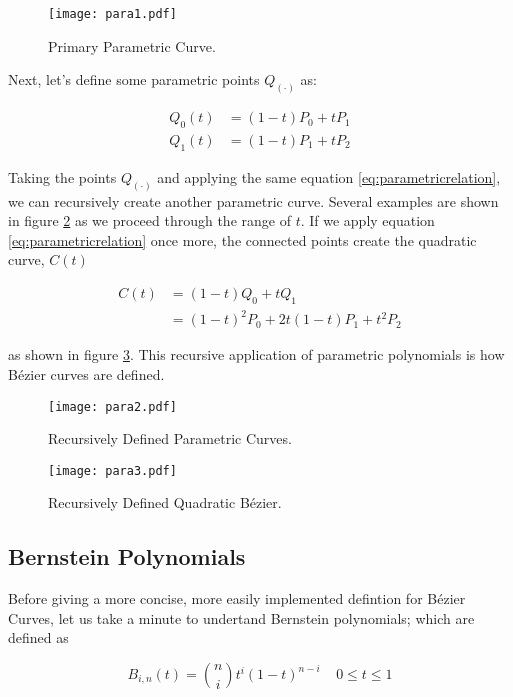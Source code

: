 \begin{figure}[htbp]
	\centering
	\texttt{[image: para1.pdf]}
	\caption{Primary Parametric Curve.}
	\label{fig:para1}
\end{figure}

Next, let's define some parametric points $Q_{(\cdot)}$ as:

\begin{align}
Q_0(t) &=  (1-t)P_0 + tP_1 \\
Q_1(t) &=  (1-t)P_1 + tP_2
 \end{align} 
 
Taking the points $Q_{(\cdot)}$ and applying the same equation \cref{eq:parametricrelation}, we can recursively create another parametric curve. Several examples are shown in figure \cref{fig:para2} as we proceed through the range of $t$. If we apply equation \cref{eq:parametricrelation} once more, the connected points create the quadratic curve, $C(t)$

\begin{align}
C(t) &= (1-t)Q_0 + tQ_1 \\
&= (1-t)^2P_0 + 2t(1-t)P_1+t^2P_2 
\end{align} 

as shown in figure \cref{fig:para3}. This recursive application of parametric polynomials is how Bézier curves are defined.
 
 \begin{figure}[htbp]
 	\centering
 	\texttt{[image: para2.pdf]}
 	\caption{Recursively Defined Parametric Curves.}
 	\label{fig:para2}
 \end{figure}

 
\begin{figure}[htbp]
	\centering
	\texttt{[image: para3.pdf]}
	\caption{Recursively Defined Quadratic Bézier.}
	\label{fig:para3}
\end{figure}


\subsection{Bernstein Polynomials}
Before giving a more concise, more easily implemented defintion for Bézier Curves, let us take a minute to undertand Bernstein polynomials; which are defined as

\begin{equation} B_{i,n}(t) = {n\choose i} t^i (1-t)^{n-i} ~~~~~0\leq t \leq1 \end{equation}

